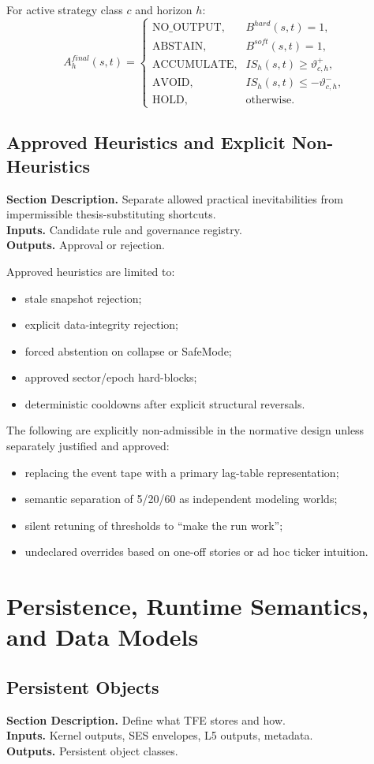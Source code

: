 \documentclass[11pt]{report}
\newcommand{\meta}[3]{\textbf{Section Description.} #1\\
\textbf{Inputs.} #2\\
\textbf{Outputs.} #3\par}
\begin{document}
For active strategy class $c$ and horizon $h$:
\[
A_h^{final}(s,t)=
\begin{cases}
\text{NO\_OUTPUT}, & B^{hard}(s,t)=1,\\
\text{ABSTAIN}, & B^{soft}(s,t)=1,\\
\text{ACCUMULATE}, & IS_h(s,t)\ge \vartheta_{c,h}^{+},\\
\text{AVOID}, & IS_h(s,t)\le -\vartheta_{c,h}^{-},\\
\text{HOLD}, & \text{otherwise.}
\end{cases}
\]

\section{Approved Heuristics and Explicit Non-Heuristics}
\meta{Separate allowed practical inevitabilities from impermissible thesis-substituting shortcuts.}{Candidate rule and governance registry.}{Approval or rejection.}

Approved heuristics are limited to:
\begin{itemize}
\item stale snapshot rejection;
\item explicit data-integrity rejection;
\item forced abstention on collapse or SafeMode;
\item approved sector/epoch hard-blocks;
\item deterministic cooldowns after explicit structural reversals.
\end{itemize}

The following are explicitly non-admissible in the normative design unless separately justified and approved:
\begin{itemize}
\item replacing the event tape with a primary lag-table representation;
\item semantic separation of 5/20/60 as independent modeling worlds;
\item silent retuning of thresholds to ``make the run work'';
\item undeclared overrides based on one-off stories or ad hoc ticker intuition.
\end{itemize}

\chapter{Persistence, Runtime Semantics, and Data Models}
\section{Persistent Objects}
\meta{Define what TFE stores and how.}{Kernel outputs, SES envelopes, L5 outputs, metadata.}{Persistent object classes.}
\end{document}
